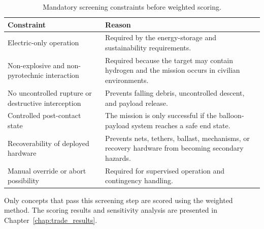 \begin{table}[H]
\centering
\small
\caption{Mandatory screening constraints before weighted scoring.}
\label{tab:screening_constraints}
\begin{tabularx}{\textwidth}{p{} X}
\toprule
\textbf{Constraint} & \textbf{Reason} \\
\midrule
Electric-only operation & Required by the energy-storage and sustainability requirements. \\
Non-explosive and non-pyrotechnic interaction & Required because the target may contain hydrogen and the mission occurs in civilian environments. \\
No uncontrolled rupture or destructive interception & Prevents falling debris, uncontrolled descent, and payload release. \\
Controlled post-contact state & The mission is only successful if the balloon-payload system reaches a safe end state. \\
Recoverability of deployed hardware & Prevents nets, tethers, ballast, mechanisms, or recovery hardware from becoming secondary hazards. \\
Manual override or abort possibility & Required for supervised operation and contingency handling. \\
\bottomrule
\end{tabularx}
\end{table}

Only concepts that pass this screening step are scored using the weighted method. The scoring results and sensitivity analysis are presented in Chapter~\ref{chap:trade_results}.













